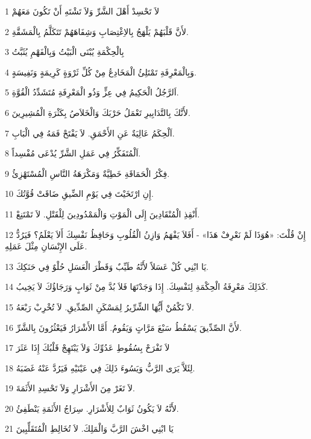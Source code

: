 \par 1 لاَ تَحْسِدْ أَهْلَ الشَّرِّ وَلاَ تَشْتَهِ أَنْ تَكُونَ مَعَهُمْ
\par 2 لأَنَّ قَلْبَهُمْ يَلْهَجُ بِالاِغْتِصَابِ وَشِفَاهَهُمْ تَتَكَلَّمُ بِالْمَشَقَّةِ.
\par 3 بِالْحِكْمَةِ يُبْنَى الْبَيْتُ وَبِالْفَهْمِ يُثَبَّتُ
\par 4 وَبِالْمَعْرِفَةِ تَمْتَلِئُ الْمَخَادِعُ مِنْ كُلِّ ثَرْوَةٍ كَرِيمَةٍ وَنَفِيسَةٍ.
\par 5 اَلرَّجُلُ الْحَكِيمُ فِي عِزٍّ وَذُو الْمَعْرِفَةِ مُتَشَدِّدُ الْقُوَّةِ.
\par 6 لأَنَّكَ بِالتَّدَابِيرِ تَعْمَلُ حَرْبَكَ وَالْخَلاَصُ بِكَثْرَةِ الْمُشِيرِينَ.
\par 7 اَلْحِكَمُ عَالِيَةٌ عَنِ الأَحْمَقِ. لاَ يَفْتَحْ فَمَهُ فِي الْبَابِ.
\par 8 اَلْمُتَفَكِّرُ فِي عَمَلِ الشَّرِّ يُدْعَى مُفْسِداً.
\par 9 فِكْرُ الْحَمَاقَةِ خَطِيَّةٌ وَمَكْرَهَةُ النَّاسِ الْمُسْتَهْزِئُ.
\par 10 إِنِ ارْتَخَيْتَ فِي يَوْمِ الضِّيقِ ضَاقَتْ قُوَّتُكَ.
\par 11 أَنْقِذِ الْمُنْقَادِينَ إِلَى الْمَوْتِ وَالْمَمْدُودِينَ لِلْقَتْلِ. لاَ تَمْتَنِعْ.
\par 12 إِنْ قُلْتَ: «هُوَذَا لَمْ نَعْرِفْ هَذَا» - أَفَلاَ يَفْهَمُ وَازِنُ الْقُلُوبِ وَحَافِظُ نَفْسِكَ أَلاَ يَعْلَمُ؟ فَيَرُدُّ عَلَى الإِنْسَانِ مِثْلَ عَمَلِهِ.
\par 13 يَا ابْنِي كُلْ عَسَلاً لأَنَّهُ طَيِّبٌ وَقَطْرَ الْعَسَلِ حُلْوٌ فِي حَنَكِكَ.
\par 14 كَذَلِكَ مَعْرِفَةُ الْحِكْمَةِ لِنَفْسِكَ. إِذَا وَجَدْتَهَا فَلاَ بُدَّ مِنْ ثَوَابٍ وَرَجَاؤُكَ لاَ يَخِيبُ.
\par 15 لاَ تَكْمُنْ أَيُّهَا الشِّرِّيرُ لِمَسْكَنِ الصِّدِّيقِ. لاَ تُخْرِبْ رَبْعَهُ.
\par 16 لأَنَّ الصِّدِّيقَ يَسْقُطُ سَبْعَ مَرَّاتٍ وَيَقُومُ. أَمَّا الأَشْرَارُ فَيَعْثُرُونَ بِالشَّرِّ.
\par 17 لاَ تَفْرَحْ بِسُقُوطِ عَدُوِّكَ وَلاَ يَبْتَهِجْ قَلْبُكَ إِذَا عَثَرَ
\par 18 لِئَلاَّ يَرَى الرَّبُّ وَيَسُوءَ ذَلِكَ فِي عَيْنَيْهِ فَيَرُدَّ عَنْهُ غَضَبَهُ.
\par 19 لاَ تَغَرْ مِنَ الأَشْرَارِ وَلاَ تَحْسِدِ الأَثَمَةَ.
\par 20 لأَنَّهُ لاَ يَكُونُ ثَوَابٌ لِلأَشْرَارِ. سِرَاجُ الأَثَمَةِ يَنْطَفِئُ.
\par 21 يَا ابْنِي اخْشَ الرَّبَّ وَالْمَلِكَ. لاَ تُخَالِطِ الْمُتَقَلِّبِينَ
